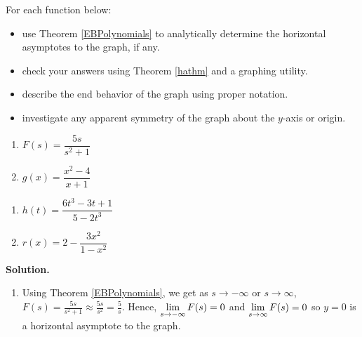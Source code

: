 \documentclass{ximera}
\begin{document}
\begin{ex} \label{haexample} For each function below:

\begin{itemize}

\item use Theorem \ref{EBPolynomials} to  analytically determine the horizontal asymptotes to the graph, if any.

\item check your answers using Theorem \ref{hathm} and a graphing utility.   

\item describe the end behavior of the graph using proper notation.

\item  investigate any apparent symmetry of the graph about the $y$-axis or origin.

\end{itemize}

\begin{multicols}{2}
\begin{enumerate}

\item $F(s) = \dfrac{5s}{s^2+1}$  

\item  $g(x) = \dfrac{x^2-4}{x+1}$ 

\setcounter{HW}{\value{enumi}}
\end{enumerate}
\end{multicols}

\begin{multicols}{2}
\begin{enumerate}
\setcounter{enumi}{\value{HW}}


\item  $h(t) = \dfrac{6t^3-3t+1}{5-2t^3}$

\item  $r(x) = 2 - \dfrac{3x^2}{1-x^2}$ 

\setcounter{HW}{\value{enumi}}
\end{enumerate}
\end{multicols}


{ \bf Solution.}

\begin{enumerate}

\item  Using  Theorem \ref{EBPolynomials}, we get as $s \rightarrow  -\infty$ or $s \rightarrow \infty$, $F(s) = \frac{5s}{s^2+1}  \approx \frac{5s}{s^2} = \frac{5}{s}$.  Hence, $\ds{\lim_{s \rightarrow  -\infty} F(s) = 0}$ and $\ds{\lim_{s \rightarrow  \infty} F(s) = 0}$   so $y = 0$ is a horizontal asymptote to the graph.  


\end{enumerate}
\end{ex}
\end{document}

